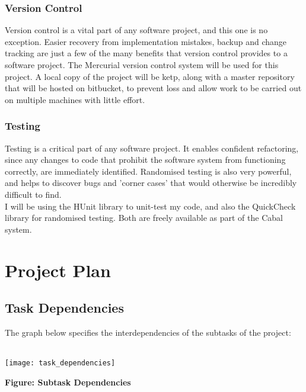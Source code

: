 \documentclass{article}
\begin{document}
\subsubsection{Version Control}
Version control is a vital part of any software project, and this one is no exception. Easier recovery from implementation mistakes, backup and change tracking are just a few of the many benefits that version control provides to a software project. The Mercurial version control system will be used for this project. A local copy of the project will be ketp, along with a master repository that will be hosted on bitbucket, to prevent loss and allow work to be carried out on multiple machines with little effort. \\

\subsubsection{Testing}
Testing is a critical part of any software project. It enables confident refactoring, since any changes to code that prohibit the software system from functioning correctly, are immediately identified. Randomised testing is also very powerful, and helps to discover bugs and 'corner cases' that would otherwise be incredibly difficult to find.
\\
\indent I will be using the HUnit library to unit-test my code, and also the QuickCheck library for randomised testing. Both are freely available as part of the Cabal system.

\pagebreak
\section{Project Plan}
\subsection{Task Dependencies}
The graph below specifies the interdependencies of the subtasks of the project:
\\\\
\centerline{\texttt{[image: task\_dependencies]}}
\centerline{\textbf{Figure: Subtask Dependencies}}
\end{document}
